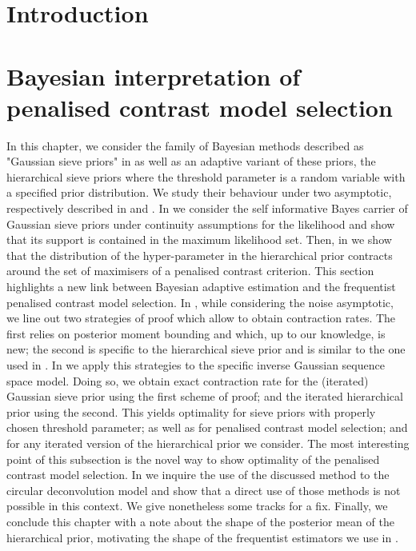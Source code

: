 \documentclass[a4paper,11pt]{book}
\begin{document}

%
\tableofcontents

%
\chapter{Introduction}\label{1}




%
\chapter{Bayesian interpretation of penalised contrast model selection}\label{2}
%
In this chapter, we consider the family of Bayesian methods described as "Gaussian sieve priors" in  as well as an adaptive variant of these priors, the hierarchical sieve priors where the threshold parameter is a random variable with a specified prior distribution.
We study their behaviour under two asymptotic, respectively described in  and .
%
In  we consider the self informative Bayes carrier of Gaussian sieve priors under continuity assumptions for the likelihood and show that its support is contained in the maximum likelihood set.
Then, in  we show that the distribution of the hyper-parameter in the hierarchical prior contracts around the set of maximisers of a penalised contrast criterion.
This section highlights a new link between Bayesian adaptive estimation and the frequentist penalised contrast model selection.
%
\medskip
%
In , while considering the noise asymptotic, we line out two strategies of proof which allow to obtain contraction rates. The first relies on posterior moment bounding and which, up to our knowledge, is new; the second is specific to the hierarchical sieve prior and is similar to the one used in .
In  we apply this strategies to the specific inverse Gaussian sequence space model.
Doing so, we obtain exact contraction rate for the (iterated) Gaussian sieve prior using the first scheme of proof; and the iterated hierarchical prior using the second.
This yields optimality for sieve priors with properly chosen threshold parameter; as well as for penalised contrast model selection; and for any iterated version of the hierarchical prior we consider.
The most interesting point of this subsection is the novel way to show optimality of the penalised contrast model selection.
%
\medskip
%
In  we inquire the use of the discussed method to the circular deconvolution model and show that a direct use of those methods is not possible in this context.
We give nonetheless some tracks for a fix.
%
\medskip
%
Finally, we conclude this chapter with a note about the shape of the posterior mean of the hierarchical prior, motivating the shape of the frequentist estimators we use in .
%






%
\end{document}
